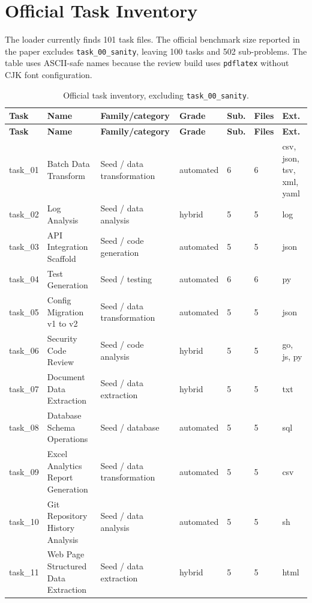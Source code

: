 \documentclass[11pt]{article}
\begin{document}
\section{Official Task Inventory}
\label{app:task-inventory}
The loader currently finds 101 task files. The official benchmark size reported in the paper excludes \texttt{task\_00\_sanity}, leaving 100 tasks and 502 sub-problems. The table uses ASCII-safe names because the review build uses \texttt{pdflatex} without CJK font configuration.
\begingroup
\footnotesize
\setlength{\tabcolsep}{1pt}
\begin{longtable}{L{0.09\textwidth}L{0.30\textwidth}L{0.25\textwidth}L{0.10\textwidth}L{0.07\textwidth}L{0.07\textwidth}L{0.08\textwidth}}
\caption{Official task inventory, excluding \texttt{task\_00\_sanity}.}\label{tab:task-inventory}\\
\toprule
\textbf{Task} & \textbf{Name} & \textbf{Family/category} & \textbf{Grade} & \textbf{Sub.} & \textbf{Files} & \textbf{Ext.} \\
\midrule
\endfirsthead
\toprule
\textbf{Task} & \textbf{Name} & \textbf{Family/category} & \textbf{Grade} & \textbf{Sub.} & \textbf{Files} & \textbf{Ext.} \\
\midrule
\endhead
task\_01 & Batch Data Transform & Seed / data transformation & automated & 6 & 6 & csv, json, tsv, xml, yaml \\
task\_02 & Log Analysis & Seed / data analysis & hybrid & 5 & 5 & log \\
task\_03 & API Integration Scaffold & Seed / code generation & automated & 5 & 5 & json \\
task\_04 & Test Generation & Seed / testing & automated & 6 & 6 & py \\
task\_05 & Config Migration v1 to v2 & Seed / data transformation & automated & 5 & 5 & json \\
task\_06 & Security Code Review & Seed / code analysis & hybrid & 5 & 5 & go, js, py \\
task\_07 & Document Data Extraction & Seed / data extraction & hybrid & 5 & 5 & txt \\
task\_08 & Database Schema Operations & Seed / database & automated & 5 & 5 & sql \\
task\_09 & Excel Analytics Report Generation & Seed / data transformation & automated & 5 & 5 & csv \\
task\_10 & Git Repository History Analysis & Seed / data analysis & automated & 5 & 5 & sh \\
task\_11 & Web Page Structured Data Extraction & Seed / data extraction & hybrid & 5 & 5 & html \\

\end{longtable}
\end{document}
